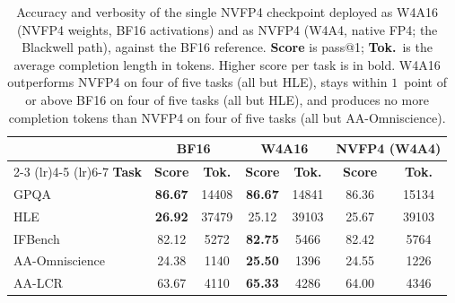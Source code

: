 \begin{table}[ht!]
\centering
\small
\setlength{\tabcolsep}{5pt}
\renewcommand{\arraystretch}{1.3}

\begin{tabular}{l|cc|cc|cc}
\toprule
& \multicolumn{2}{c|}{\textbf{BF16}}
& \multicolumn{2}{c|}{\textbf{W4A16}}
& \multicolumn{2}{c}{\textbf{NVFP4 (W4A4)}} \\
\cmidrule(lr){2-3} \cmidrule(lr){4-5} \cmidrule(lr){6-7}
\textbf{Task} & \textbf{Score} & \textbf{Tok.}
            & \textbf{Score} & \textbf{Tok.}
            & \textbf{Score} & \textbf{Tok.} \\
\midrule
GPQA           & \textbf{86.67} & 14408 & \textbf{86.67} & 14841 & 86.36          & 15134 \\
HLE            & \textbf{26.92} & 37479 & 25.12          & 39103 & 25.67          & 39103 \\
IFBench        & 82.12          & 5272  & \textbf{82.75} & 5466  & 82.42          & 5764  \\
AA-Omniscience & 24.38          & 1140  & \textbf{25.50} & 1396  & 24.55          & 1226  \\
AA-LCR         & 63.67          & 4110  & \textbf{65.33} & 4286  & 64.00          & 4346  \\
\bottomrule
\end{tabular}
\caption[BF16 vs.\ W4A16 vs.\ NVFP4]{
  Accuracy and verbosity of the single NVFP4 checkpoint deployed as W4A16 (NVFP4
  weights, BF16 activations) and as NVFP4 (W4A4, native FP4; the
  Blackwell path), against the BF16 reference. \textbf{Score} is pass@1; \textbf{Tok.}\
  is the average completion length in tokens. Higher score per task is in bold.
  W4A16 outperforms NVFP4 on four of five tasks (all but HLE), stays within $1$~point
  of or above BF16 on four of five tasks (all but HLE), and produces no more completion
  tokens than NVFP4 on four of five tasks (all but AA-Omniscience).
}
\label{tab:w4a16-vs-nvfp4}
\end{table}


